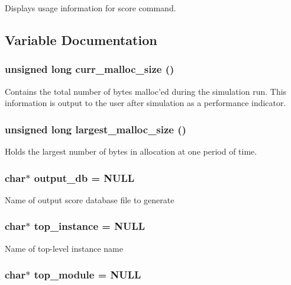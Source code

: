 Displays usage information for score command. 

\subsection{Variable Documentation}
\subsubsection{\setlength{\rightskip}{0pt plus 5cm}unsigned long curr\_\-malloc\_\-size ()}\label{score_8c_a5}


Contains the total number of bytes malloc'ed during the simulation run. This information is output to the user after simulation as a performance indicator. 
\subsubsection{\setlength{\rightskip}{0pt plus 5cm}unsigned long largest\_\-malloc\_\-size ()}\label{score_8c_a4}


Holds the largest number of bytes in allocation at one period of time. 
\subsubsection{\setlength{\rightskip}{0pt plus 5cm}char$\ast$ output\_\-db = NULL}\label{score_8c_a2}


Name of output score database file to generate 
\subsubsection{\setlength{\rightskip}{0pt plus 5cm}char$\ast$ top\_\-instance = NULL}\label{score_8c_a1}


Name of top-level instance name 
\subsubsection{\setlength{\rightskip}{0pt plus 5cm}char$\ast$ top\_\-module = NULL}\label{score_8c_a0}


